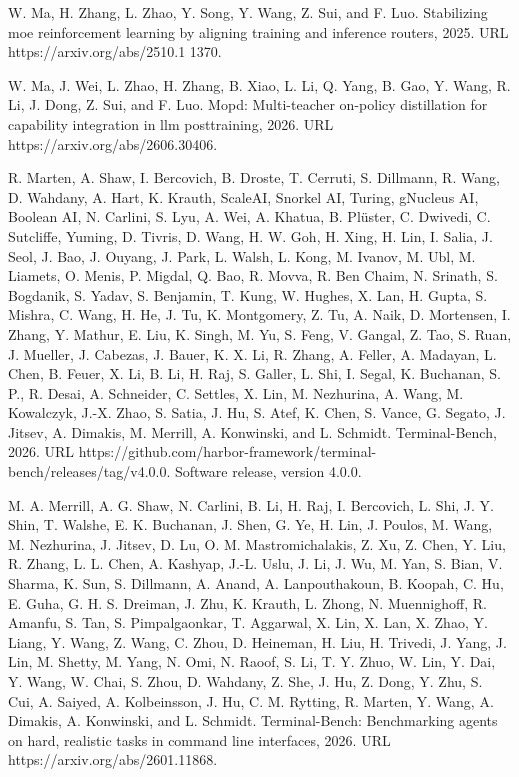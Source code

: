 \documentclass[
  10
]{article}
\begin{document}
W. Ma, H. Zhang, L. Zhao, Y. Song, Y. Wang, Z. Sui, and F. Luo.
Stabilizing moe reinforcement learning by aligning training and
inference routers, 2025. URL https://arxiv.org/abs/2510.1 1370.

W. Ma, J. Wei, L. Zhao, H. Zhang, B. Xiao, L. Li, Q. Yang, B. Gao, Y.
Wang, R. Li, J. Dong, Z. Sui, and F. Luo. Mopd: Multi-teacher on-policy
distillation for capability integration in llm posttraining, 2026. URL
https://arxiv.org/abs/2606.30406.

R. Marten, A. Shaw, I. Bercovich, B. Droste, T. Cerruti, S. Dillmann, R.
Wang, D. Wahdany, A. Hart, K. Krauth, ScaleAI, Snorkel AI, Turing,
gNucleus AI, Boolean AI, N. Carlini, S. Lyu, A. Wei, A. Khatua, B.
Plüster, C. Dwivedi, C. Sutcliffe, Yuming, D. Tivris, D. Wang, H. W. Goh,
H. Xing, H. Lin, I. Salia, J. Seol, J. Bao, J. Ouyang, J. Park, L.
Walsh, L. Kong, M. Ivanov, M. Ubl, M. Liamets, O. Menis, P. Migdal, Q.
Bao, R. Movva, R. Ben Chaim, N. Srinath, S. Bogdanik, S. Yadav, S.
Benjamin, T. Kung, W. Hughes, X. Lan, H. Gupta, S. Mishra, C. Wang, H.
He, J. Tu, K. Montgomery, Z. Tu, A. Naik, D. Mortensen, I. Zhang, Y.
Mathur, E. Liu, K. Singh, M. Yu, S. Feng, V. Gangal, Z. Tao, S. Ruan, J.
Mueller, J. Cabezas, J. Bauer, K. X. Li, R. Zhang, A. Feller, A.
Madayan, L. Chen, B. Feuer, X. Li, B. Li, H. Raj, S. Galler, L. Shi, I.
Segal, K. Buchanan, S. P., R. Desai, A. Schneider, C. Settles, X. Lin,
M. Nezhurina, A. Wang, M. Kowalczyk, J.-X. Zhao, S. Satia, J. Hu, S.
Atef, K. Chen, S. Vance, G. Segato, J. Jitsev, A. Dimakis, M. Merrill,
A. Konwinski, and L. Schmidt. Terminal-Bench, 2026. URL
https://github.com/harbor-framework/terminal-bench/releases/tag/v4.0.0.
Software release, version 4.0.0.

M. A. Merrill, A. G. Shaw, N. Carlini, B. Li, H. Raj, I. Bercovich, L.
Shi, J. Y. Shin, T. Walshe, E. K. Buchanan, J. Shen, G. Ye, H. Lin, J.
Poulos, M. Wang, M. Nezhurina, J. Jitsev, D. Lu, O. M. Mastromichalakis,
Z. Xu, Z. Chen, Y. Liu, R. Zhang, L. L. Chen, A. Kashyap, J.-L. Uslu, J.
Li, J. Wu, M. Yan, S. Bian, V. Sharma, K. Sun, S. Dillmann, A. Anand, A.
Lanpouthakoun, B. Koopah, C. Hu, E. Guha, G. H. S. Dreiman, J. Zhu, K.
Krauth, L. Zhong, N. Muennighoff, R. Amanfu, S. Tan, S. Pimpalgaonkar, T.
Aggarwal, X. Lin, X. Lan, X. Zhao, Y. Liang, Y. Wang, Z. Wang, C. Zhou,
D. Heineman, H. Liu, H. Trivedi, J. Yang, J. Lin, M. Shetty, M. Yang, N.
Omi, N. Raoof, S. Li, T. Y. Zhuo, W. Lin, Y. Dai, Y. Wang, W. Chai, S.
Zhou, D. Wahdany, Z. She, J. Hu, Z. Dong, Y. Zhu, S. Cui, A. Saiyed, A.
Kolbeinsson, J. Hu, C. M. Rytting, R. Marten, Y. Wang, A. Dimakis, A.
Konwinski, and L. Schmidt. Terminal-Bench: Benchmarking agents on hard,
realistic tasks in command line interfaces, 2026. URL
https://arxiv.org/abs/2601.11868.
\end{document}
